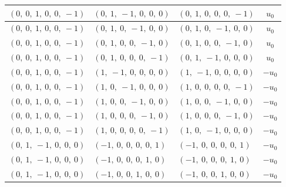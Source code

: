 \documentclass[11pt]{article}
\theoremstyle{definition}
\begin{document}
\begin{longtable}{|l|l|l|c|}
    \hline
    $\left( 0, \  0, \  1, \  0, \  0, \  -1\right)$ & $\left( 0, \  1, \  -1, \  0, \  0, \  0\right)$ & $\left( 0, \  1, \  0, \  0, \  0, \  -1\right)$ & $u_{0}$ \\
    \hline
    $\left( 0, \  0, \  1, \  0, \  0, \  -1\right)$ & $\left( 0, \  1, \  0, \  -1, \  0, \  0\right)$ & $\left( 0, \  1, \  0, \  -1, \  0, \  0\right)$ & $u_{0}$ \\
    \hline
    $\left( 0, \  0, \  1, \  0, \  0, \  -1\right)$ & $\left( 0, \  1, \  0, \  0, \  -1, \  0\right)$ & $\left( 0, \  1, \  0, \  0, \  -1, \  0\right)$ & $u_{0}$ \\
    \hline
    $\left( 0, \  0, \  1, \  0, \  0, \  -1\right)$ & $\left( 0, \  1, \  0, \  0, \  0, \  -1\right)$ & $\left( 0, \  1, \  -1, \  0, \  0, \  0\right)$ & $u_{0}$ \\
    \hline
    $\left( 0, \  0, \  1, \  0, \  0, \  -1\right)$ & $\left( 1, \  -1, \  0, \  0, \  0, \  0\right)$ & $\left( 1, \  -1, \  0, \  0, \  0, \  0\right)$ & $- u_{0}$ \\
    \hline
    $\left( 0, \  0, \  1, \  0, \  0, \  -1\right)$ & $\left( 1, \  0, \  -1, \  0, \  0, \  0\right)$ & $\left( 1, \  0, \  0, \  0, \  0, \  -1\right)$ & $- u_{0}$ \\
    \hline
    $\left( 0, \  0, \  1, \  0, \  0, \  -1\right)$ & $\left( 1, \  0, \  0, \  -1, \  0, \  0\right)$ & $\left( 1, \  0, \  0, \  -1, \  0, \  0\right)$ & $- u_{0}$ \\
    \hline
    $\left( 0, \  0, \  1, \  0, \  0, \  -1\right)$ & $\left( 1, \  0, \  0, \  0, \  -1, \  0\right)$ & $\left( 1, \  0, \  0, \  0, \  -1, \  0\right)$ & $- u_{0}$ \\
    \hline
    $\left( 0, \  0, \  1, \  0, \  0, \  -1\right)$ & $\left( 1, \  0, \  0, \  0, \  0, \  -1\right)$ & $\left( 1, \  0, \  -1, \  0, \  0, \  0\right)$ & $- u_{0}$ \\
    \hline
    $\left( 0, \  1, \  -1, \  0, \  0, \  0\right)$ & $\left( -1, \  0, \  0, \  0, \  0, \  1\right)$ & $\left( -1, \  0, \  0, \  0, \  0, \  1\right)$ & $- u_{0}$ \\
    \hline
    $\left( 0, \  1, \  -1, \  0, \  0, \  0\right)$ & $\left( -1, \  0, \  0, \  0, \  1, \  0\right)$ & $\left( -1, \  0, \  0, \  0, \  1, \  0\right)$ & $- u_{0}$ \\
    \hline
    $\left( 0, \  1, \  -1, \  0, \  0, \  0\right)$ & $\left( -1, \  0, \  0, \  1, \  0, \  0\right)$ & $\left( -1, \  0, \  0, \  1, \  0, \  0\right)$ & $- u_{0}$ \\

\end{longtable}
\end{document}
